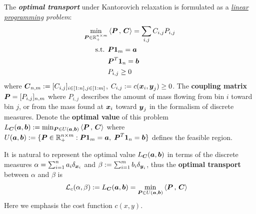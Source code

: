 \documentclass[11pt]{article}
\begin{document}
The \textbf{\emph{optimal transport}} under Kantorovich relaxation is formulated as a \emph{\underline{linear programming} problem}:
\begin{align}
\min_{\boldsymbol{P} \in {\mathbb R}_{+}^{n \times m}} & \left\langle \boldsymbol{P}\,,\, \boldsymbol{C} \right\rangle = \sum_{i,j}C_{i,j} P_{i,j} \label{eqn: optimal_transport_linear_prog}\\
\text{s.t. }&  \boldsymbol{P}\boldsymbol{1}_{m} = \boldsymbol{a} \label{eqn: optimal_transport_linear_constraint}\\
&\boldsymbol{P}^{T}\boldsymbol{1}_{n} = \boldsymbol{b}  \label{eqn: optimal_transport_linear_constraint2} \\
&P_{i,j} \ge 0 \nonumber
\end{align} where $\boldsymbol{C}_{n,m} := [C_{i,j}]_{i\in [1:n], j\in [1:m]}$,  $C_{i,j}:= c(\boldsymbol{x}_i, \boldsymbol{y}_j) \ge 0$. The \textbf{coupling matrix}  $\boldsymbol{P} = [P_{i,j}]_{n, m}$ where $P_{i,j}$ describes the amount of mass flowing from bin $i$ toward bin $j$, or from the mass found at $\boldsymbol{x}_i$ toward $\boldsymbol{y}_j$ in the formalism of
discrete measures. Denote the \textbf{optimal value} of this problem $L_{\boldsymbol{C}}(\boldsymbol{a}, \boldsymbol{b}) := \min_{\boldsymbol{P} \in U(\boldsymbol{a}, \boldsymbol{b})}  \left\langle \boldsymbol{P}\,,\, \boldsymbol{C} \right\rangle$ where $U(\boldsymbol{a}, \boldsymbol{b}) := \{\boldsymbol{P} \in {\mathbb R}_{+}^{n \times m}: \boldsymbol{P}\boldsymbol{1}_{m} = \boldsymbol{a}, \;\boldsymbol{P}^{T}\boldsymbol{1}_{n} = \boldsymbol{b}\}$ defines the feasible region.

It is natural to represent the optimal value $L_{\boldsymbol{C}}(\boldsymbol{a}, \boldsymbol{b})$ in terms of the discrete measures $\alpha = \sum_{i=1}^{n}a_i \delta_{\boldsymbol{x}_{i}}$ and $\beta := \sum_{i=1}^{m}b_i \delta_{\boldsymbol{y}_{i}}$, thus the \textbf{optimal transport} between $\alpha$ and $\beta$ is 
\begin{align}
{\mathcal L}_{c}(\alpha, \beta) &:= L_{\boldsymbol{C}}(\boldsymbol{a}, \boldsymbol{b}) =  \min_{\boldsymbol{P} \in U(\boldsymbol{a}, \boldsymbol{b})}  \left\langle \boldsymbol{P}\,,\, \boldsymbol{C} \right\rangle \label{eqn: optimal_transport_value}
\end{align} Here we emphasis the cost function $c(x, y)$.
\end{document}
